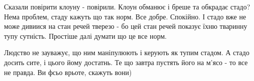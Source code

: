 Сказали повірити клоуну - повірили. Клоун обманює і бреше та обкрадає стадо?
Нема проблем, стаду кажуть що так норм. Все добре. Спокійно. І стадо вже не
може дивиися на стан речей тверезо - бо цей стан речей показує їхню тваринну
тупу сутність. Простіше далі думати що це все норм.

Людство не зауважує, що ним маніпулюють і керують як тупим стадом. А стадо
досить сите, і цього йому достатнь. Те що завтра пустять його на м'ясо - то все
не правда. Ви фсьо врьоте, скажуть вони)

